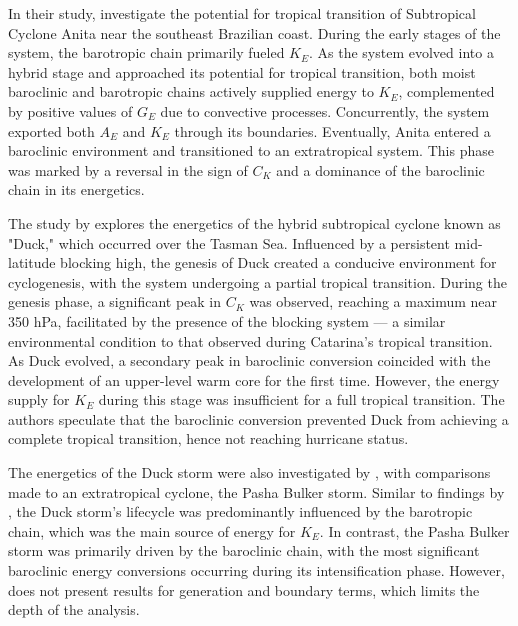 In their study, \citet{dias2013synoptic} investigate the potential for tropical transition of Subtropical Cyclone Anita near the southeast Brazilian coast. During the early stages of the system, the barotropic chain primarily fueled \(K_E\). As the system evolved into a hybrid stage and approached its potential for tropical transition, both moist baroclinic and barotropic chains actively supplied energy to \(K_E\), complemented by positive values of \(G_E\) due to convective processes. Concurrently, the system exported both \(A_E\) and \(K_E\) through its boundaries. Eventually, Anita entered a baroclinic environment and transitioned to an extratropical system. This phase was marked by a reversal in the sign of \(C_K\) and a dominance of the baroclinic chain in its energetics.

The study by \citet{pezza2014large} explores the energetics of the hybrid subtropical cyclone known as "Duck," which occurred over the Tasman Sea. Influenced by a persistent mid-latitude blocking high, the genesis of Duck created a conducive environment for cyclogenesis, with the system undergoing a partial tropical transition. During the genesis phase, a significant peak in \(C_K\) was observed, reaching a maximum near 350 hPa, facilitated by the presence of the blocking system — a similar environmental condition to that observed during Catarina's tropical transition. As Duck evolved, a secondary peak in baroclinic conversion coincided with the development of an upper-level warm core for the first time. However, the energy supply for $K_E$ during this stage was insufficient for a full tropical transition. The authors speculate that the baroclinic conversion prevented Duck from achieving a complete tropical transition, hence not reaching hurricane status.

The energetics of the Duck storm were also investigated by \citet{cavicchia2018energetics}, with comparisons made to an extratropical cyclone, the Pasha Bulker storm. Similar to findings by \citet{pezza2014large}, the Duck storm's lifecycle was predominantly influenced by the barotropic chain, which was the main source of energy for \(K_E\). In contrast, the Pasha Bulker storm was primarily driven by the baroclinic chain, with the most significant baroclinic energy conversions occurring during its intensification phase. However, \citet{cavicchia2018energetics} does not present results for generation and boundary terms, which limits the depth of the analysis.


